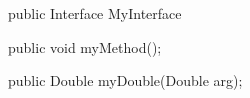 \begin{lstlistings}
public Interface MyInterface {
  public void myMethod();
  
  public Double myDouble(Double arg);
}
\end{lstlistings}
